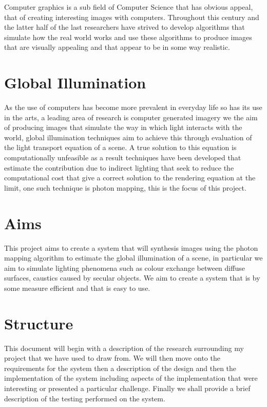 Computer graphics is a sub field of Computer Science that has obvious appeal, that of creating interesting images with computers. Throughout
this century and the latter half of the last researchers have strived to develop algorithms that simulate how the real world works
and use these algorithms to produce images that are visually appealing and that appear to be in some way realistic.

\section{Global Illumination}
As the use of computers has become more prevalent in everyday life so has its use in the arts, a leading area of research is
computer generated imagery we the aim of producing images that simulate the way in which light interacts
with the world, global illumination techniques aim to achieve this through evaluation of the light transport equation of a scene. A true
solution to this equation is computationally unfeasible as a result techniques have been developed that estimate the contribution
due to indirect lighting that seek to reduce the computational cost that give a correct solution to the rendering equation at
the limit, one such technique is photon mapping, this is the focus of this project.

\section{Aims}
This project aims to create a system that will synthesis images using the photon mapping algorithm to estimate the
global illumination of a scene, in particular we aim to simulate lighting phenomena such as colour exchange between
diffuse surfaces, caustics caused by secular objects. We aim to create a system that is by some measure efficient
and that is easy to use.

\section{Structure}
This document will begin with a description of the research surrounding my project that we have used to draw from. We will then
move onto the requirements for the system then a description of the design and then the implementation of the system including
aspects of the implementation that were interesting or presented a particular challenge. Finally we shall provide a brief description
of the testing performed on the system.
